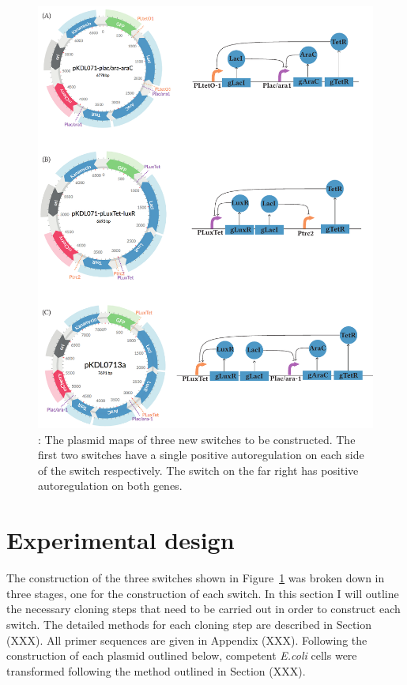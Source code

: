 \begin{figure}[htbp]
	\begin{center}
		\includegraphics[scale=0.7]{../../chapters/chapterDesignSwitches/images/final-plasmids.pdf}
		\caption[LoF caption]{\label{fig:finalpl}: The plasmid maps of three new switches to be constructed. The first two switches have a single positive autoregulation on each side of the switch respectively. The switch on the far right has positive autoregulation on both genes. }
	\end{center}
\end{figure}
\clearpage

\section{Experimental design}

The construction of the three switches shown in Figure~\ref{fig:finalpl} was broken down in three stages, one for the construction of each switch. In this section I will outline the necessary cloning steps that need to be carried out in order to construct each switch. The detailed methods for each cloning step are described in Section (XXX). All primer sequences are given in Appendix (XXX). Following the construction of each plasmid outlined below, competent \textit{E.coli} cells were transformed following the method outlined in Section (XXX).

